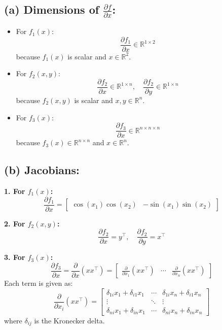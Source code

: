 \documentclass{article}
\begin{document}
\subsection*{(a) Dimensions of $\frac{\partial f}{\partial x}$:}
\begin{itemize}
    \item For $f_1(x)$: 
    \[
    \frac{\partial f_1}{\partial x} \in \mathbb{R}^{1 \times 2}
    \]
    because $f_1(x)$ is scalar and $x \in \mathbb{R}^2$.
    
    \item For $f_2(x, y)$:
    \[
    \frac{\partial f_2}{\partial x} \in \mathbb{R}^{1 \times n}, \quad \frac{\partial f_2}{\partial y} \in \mathbb{R}^{1 \times n}
    \]
    because $f_2(x, y)$ is scalar and $x, y \in \mathbb{R}^n$.

    \item For $f_3(x)$:
    \[
    \frac{\partial f_3}{\partial x} \in \mathbb{R}^{n \times n \times n}
    \]
    because $f_3(x) \in \mathbb{R}^{n \times n}$ and $x \in \mathbb{R}^n$.
\end{itemize}

\subsection*{(b) Jacobians:}

\textbf{1. For $f_1(x)$:}
\[
\frac{\partial f_1}{\partial x} = 
\begin{bmatrix}
\cos(x_1)\cos(x_2) & -\sin(x_1)\sin(x_2)
\end{bmatrix}
\]

\textbf{2. For $f_2(x, y)$:}
\[
\frac{\partial f_2}{\partial x} = y^\top, \quad \frac{\partial f_2}{\partial y} = x^\top
\]

\textbf{3. For $f_3(x)$:}
\[
\frac{\partial f_3}{\partial x} = 
\frac{\partial}{\partial x} (xx^\top) = 
\begin{bmatrix}
\frac{\partial}{\partial x_1}(xx^\top) & \cdots & \frac{\partial}{\partial x_n}(xx^\top)
\end{bmatrix}
\]
Each term is given as:
\[
\frac{\partial}{\partial x_i}(xx^\top) = 
\begin{bmatrix}
\delta_{1i}x_1 + \delta_{i1}x_1 & \cdots & \delta_{1i}x_n + \delta_{i1}x_n \\
\vdots & \ddots & \vdots \\
\delta_{ni}x_1 + \delta_{in}x_1 & \cdots & \delta_{ni}x_n + \delta_{in}x_n
\end{bmatrix}
\]
where $\delta_{ij}$ is the Kronecker delta.
\end{document}
